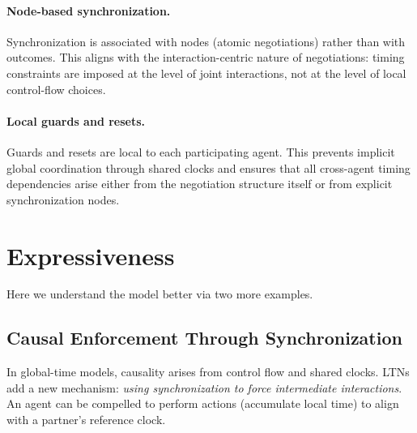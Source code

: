\paragraph{Node-based synchronization.}
Synchronization is associated with nodes (atomic negotiations) rather than with
outcomes.  This aligns with the interaction-centric nature of negotiations: timing
constraints are imposed at the level of joint interactions, not at the level of
local control-flow choices.

\paragraph{Local guards and resets.}
Guards and resets are local to each participating agent.  This prevents implicit
global coordination through shared clocks and ensures that all cross-agent timing
dependencies arise either from the negotiation structure itself or from explicit
synchronization nodes.


\section{Expressiveness}
\label{sec:ltn-expressiveness}

Here we understand the model better via two more examples.

\subsection{Causal Enforcement Through Synchronization}
\label{subsec:ltn-causal}

In global-time models, causality arises from control flow and shared clocks. LTNs add a new mechanism: \emph{using synchronization to force intermediate interactions}. An agent can be compelled to perform actions (accumulate local time) to align with a partner's reference clock.


